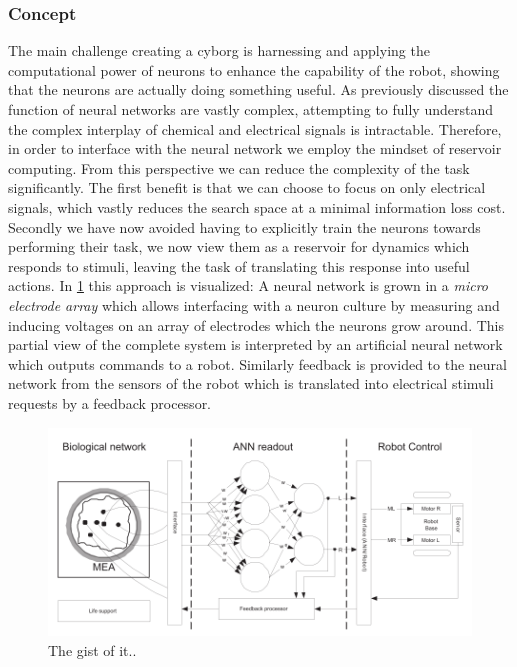 \subsubsection{Concept}
The main challenge creating a cyborg is harnessing and applying the
computational power of neurons to enhance the capability of the robot, showing
that the neurons are actually doing something useful.
As previously discussed the function of neural networks are vastly complex,
attempting to fully understand the complex interplay of chemical and electrical
signals is intractable.
Therefore, in order to interface with the neural network we employ the mindset
of reservoir computing.
From this perspective we can reduce the complexity of the task significantly.
The first benefit is that we can choose to focus on only electrical signals,
which vastly reduces the search space at a minimal information loss cost. 
Secondly we have now avoided having to explicitly train the neurons towards
performing their task, we now view them as a reservoir for dynamics which
responds to stimuli, leaving the task of translating this response into useful
actions.
In \ref{fig:cyborg_idea} this approach is visualized:
A neural network is grown in a \textit{micro electrode array} which allows
interfacing with a neuron culture by measuring and inducing voltages on an array
of electrodes which the neurons grow around.
This partial view of the complete system is interpreted by an artificial
neural network which outputs commands to a robot.
Similarly feedback is provided to the neural network from the sensors of the
robot which is translated into electrical stimuli requests by a feedback processor.
\begin{figure}[h!]
    \includegraphics[width=\linewidth]{images/cyborg_overview.png}
    \caption{The gist of it..}
    \label{fig:cyborg_idea}
\end{figure}
